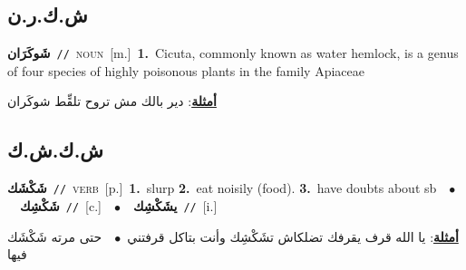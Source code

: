 \documentclass[10pt,a4paper,twoside]{article} %
\begin{document}
\begin{multicols}{2}
\vspace{-3mm}
\subsection*{\color{blue}\foreignlanguage{arabic}{ش.ك.ر.ن}\color{blue}{ (ntws)}} 

{\setlength\topsep{0pt}\textbf{\foreignlanguage{arabic}{شَوكَرَان}}\ {\color{gray}\texttt{//}\color{black}}\ \textsc{noun}\ [m.]\ \textbf{1.}~Cicuta, commonly known as water hemlock, is a genus of four species of highly poisonous plants in the family Apiaceae\  \begin{flushright}\color{gray}\foreignlanguage{arabic}{\textbf{\underline{\foreignlanguage{arabic}{أمثلة}}}: دير بالك مش تروح تلقِّط شوكَران}\end{flushright}\color{black}} \vspace{2mm}

\vspace{-3mm}
\subsection*{\color{blue}\foreignlanguage{arabic}{ش.ك.ش.ك}\color{blue}{}} 

{\setlength\topsep{0pt}\textbf{\foreignlanguage{arabic}{شَكْشَك}}\ {\color{gray}\texttt{//}\color{black}}\ \textsc{verb}\ [p.]\ \textbf{1.}~slurp  \textbf{2.}~eat noisily (food).  \textbf{3.}~have doubts about sb\ \ $\bullet$\ \ \setlength\topsep{0pt}\textbf{\foreignlanguage{arabic}{شَكْشِك}}\ {\color{gray}\texttt{//}\color{black}}\ [c.]\ \ $\bullet$\ \ \setlength\topsep{0pt}\textbf{\foreignlanguage{arabic}{يشَكْشِك}}\ {\color{gray}\texttt{//}\color{black}}\ [i.]\  \begin{flushright}\color{gray}\foreignlanguage{arabic}{\textbf{\underline{\foreignlanguage{arabic}{أمثلة}}}: يا الله قرف يقرفك تضلكاش تشَكْشِك وأنت بتاكل قرفتني\ $\bullet$\ \  حتى مرته شَكْشَك فيها}\end{flushright}\color{black}} \vspace{2mm}


\end{multicols}
\end{document}

